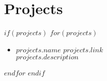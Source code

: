 \documentclass[$fontsize$, a4paper]{article}
\begin{document}
\vspace{-10pt}

\section*{Projects}
$if(projects)$
    $for(projects)$
    \begin{itemize}
    \setlength\itemsep{0.5pt}
        \item
            \textsc{$projects.name$} \hfill \href{https://$projects.link$}{$projects.link$}\\
            $projects.description$\\
        \vspace{-13pt}
    \end{itemize}
    $endfor$
$endif$
\end{document}
